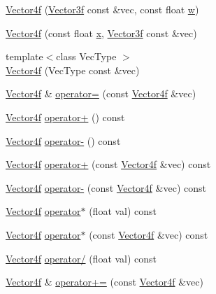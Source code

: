 \begin{DoxyCompactItemize}
\item 
\hyperlink{classh2_1_1_vector4f_aa58a3dfa49a2867b6afa83bf98363f1d}{Vector4f} (\hyperlink{classh2_1_1_vector3f}{Vector3f} const \&vec, const float \hyperlink{classh2_1_1_vector4f_aa59d06bc0affb9f4fa5c559ccd834bca}{w})
\item 
\hyperlink{classh2_1_1_vector4f_ad248628e648518611c925f3a49672a5e}{Vector4f} (const float \hyperlink{classh2_1_1_vector4f_adac3565214ca8c155656652eb63de199}{x}, \hyperlink{classh2_1_1_vector3f}{Vector3f} const \&vec)
\item 
{\footnotesize template$<$class Vec\-Type $>$ }\\\hyperlink{classh2_1_1_vector4f_afcf14d83dbf4b386d1a306f54c24a620}{Vector4f} (Vec\-Type const \&vec)
\item 
\hyperlink{classh2_1_1_vector4f}{Vector4f} \& \hyperlink{classh2_1_1_vector4f_a7ab2bd472ecef9eac756ec5c18fb8553}{operator=} (const \hyperlink{classh2_1_1_vector4f}{Vector4f} \&vec)
\item 
\hyperlink{classh2_1_1_vector4f}{Vector4f} \hyperlink{classh2_1_1_vector4f_aea87e0b241dcf78bfde6e12e51409c8d}{operator+} () const 
\item 
\hyperlink{classh2_1_1_vector4f}{Vector4f} \hyperlink{classh2_1_1_vector4f_a59c1d6408d372a40f48a5f1098533dcd}{operator-\/} () const 
\item 
\hyperlink{classh2_1_1_vector4f}{Vector4f} \hyperlink{classh2_1_1_vector4f_a7049c0d2a2cf31f2539cbef70d9c42ee}{operator+} (const \hyperlink{classh2_1_1_vector4f}{Vector4f} \&vec) const 
\item 
\hyperlink{classh2_1_1_vector4f}{Vector4f} \hyperlink{classh2_1_1_vector4f_aec3190a01fac7c5c92bd59bfab3b80aa}{operator-\/} (const \hyperlink{classh2_1_1_vector4f}{Vector4f} \&vec) const 
\item 
\hyperlink{classh2_1_1_vector4f}{Vector4f} \hyperlink{classh2_1_1_vector4f_a327822a22d9deebf900cbead75e33100}{operator$\ast$} (float val) const 
\item 
\hyperlink{classh2_1_1_vector4f}{Vector4f} \hyperlink{classh2_1_1_vector4f_a3a42057ea1b787b6425fad5850596f8b}{operator$\ast$} (const \hyperlink{classh2_1_1_vector4f}{Vector4f} \&vec) const 
\item 
\hyperlink{classh2_1_1_vector4f}{Vector4f} \hyperlink{classh2_1_1_vector4f_aa0701699fa95d7815841784646f59d2c}{operator/} (float val) const 
\item 
\hyperlink{classh2_1_1_vector4f}{Vector4f} \& \hyperlink{classh2_1_1_vector4f_afe9b463915770c618c2c4df237f0f00a}{operator+=} (const \hyperlink{classh2_1_1_vector4f}{Vector4f} \&vec)

\end{DoxyCompactItemize}
